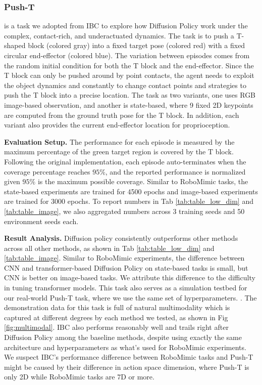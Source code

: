 \subsubsection{\textbf{Push-T}}
\label{sec:eval_sim_pusht}
is a task we adopted from IBC \cite{ibc} to explore how Diffusion Policy work under the complex, contact-rich, and underactuated dynamics. The task is to push a T-shaped block (colored gray) into a fixed target pose (colored red) with a fixed circular end-effector (colored blue). The variation between episodes comes from the random initial condition for both the T block and the end-effector. Since the T block can only be pushed around by point contacts, the agent needs to exploit the object dynamics and constantly to change contact points and strategies to push the T block into a precise location. The task as two variants, one uses RGB image-based observation, and another is state-based, where 9 fixed 2D keypoints are computed from the ground truth pose for the T block. In addition, each variant also provides the current end-effector location for proprioception.

 \textbf{Evaluation Setup.}  The performance for each episode is measured by the maximum percentage of the green target region is covered by the T block. Following the original implementation, each episode auto-terminates when the coverage percentage reaches $95\% $, and the reported performance is normalized given $95 \%$ is the maximum possible coverage. Similar to RoboMimic tasks, the state-based experiments are trained for 4500 epochs and image-based experiments are trained for 3000 epochs. To report numbers in Tab \ref{tab:table_low_dim} and \ref{tab:table_image}, we also aggregated numbers across 3 training seeds and 50 environment seeds each.

\textbf{Result Analysis.} Diffusion policy  consistently outperforms other methods across all other methods, as shown in Tab \ref{tab:table_low_dim} and \ref{tab:table_image}. Similar to RoboMimic experiments, the difference between CNN and transformer-based Diffusion Policy on state-based tasks is small, but CNN is better on image-based tasks. We attribute this difference to the difficulty in tuning transformer models. This task also serves as a simulation testbed for our real-world Push-T task, where we use the same set of hyperparameters. . The demonstration data for this task is full of natural multimodality which is captured at different degrees by each method we tested, as shown in Fig \ref{fig:multimodal}. IBC \cite{ibc} also performs reasonably well and trails right after Diffusion Policy among the baseline methods, despite using exactly the same architecture and hyperparameters as what's used for RoboMimic experiments. We suspect IBC's performance difference between RoboMimic tasks and Push-T might be caused by their difference in action space dimension, where Push-T is only 2D while RoboMimic tasks are 7D or more.

